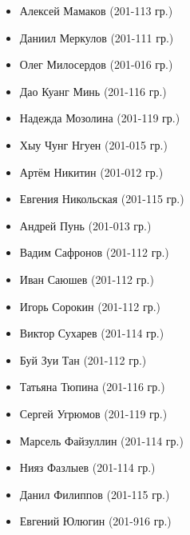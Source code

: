 \begin{itemize}
	\item Алексей Мамаков (201-113 гр.)
	\item Даниил Меркулов (201-111 гр.)
	\item Олег Милосердов (201-016 гр.)
	\item Дао Куанг Минь (201-116 гр.)
	\item Надежда Мозолина (201-119 гр.)
	\item Хыу Чунг Нгуен (201-015 гр.)
	\item Артём Никитин (201-012 гр.)
	\item Евгения Никольская (201-115 гр.)
	\item Андрей Пунь (201-013 гр.)
	\item Вадим Сафронов (201-112 гр.)
	\item Иван Саюшев (201-112 гр.)
	\item Игорь Сорокин (201-112 гр.)
	\item Виктор Сухарев (201-114 гр.)
	\item Буй Зуи Тан (201-112 гр.)
	\item Татьяна Тюпина (201-116 гр.)
	\item Сергей Угрюмов (201-119 гр.)
	\item Марсель Файзуллин (201-114 гр.)
	\item Нияз Фазлыев (201-114 гр.)
	\item Данил Филиппов (201-115 гр.)
	\item Евгений Юлюгин (201-916 гр.)
\end{itemize}
